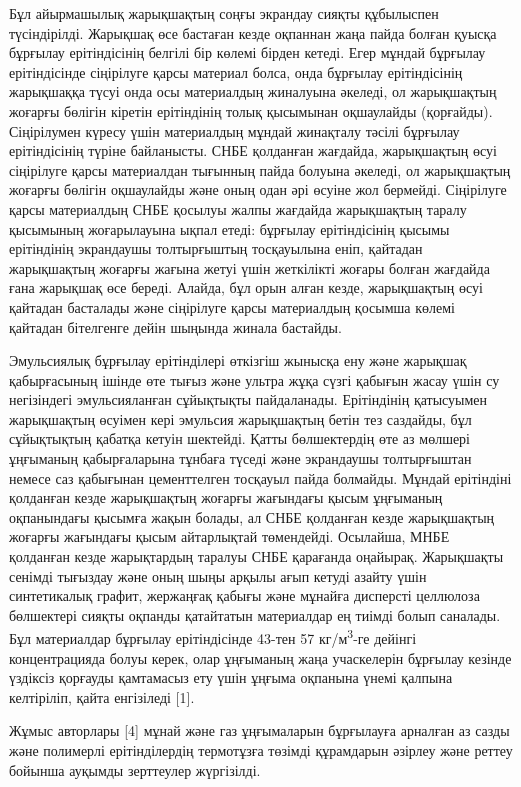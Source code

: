 \begin{multicols}{2}
Бұл айырмашылық жарықшақтың соңғы экрандау сияқты құбылыспен
түсіндірілді. Жарықшақ өсе бастаған кезде оқпаннан жаңа пайда болған
қуысқа бұрғылау ерітіндісінің белгілі бір көлемі бірден кетеді. Егер
мұндай бұрғылау ерітіндісінде сіңірілуге қарсы материал болса, онда
бұрғылау ерітіндісінің жарықшаққа түсуі онда осы материалдың жиналуына
әкеледі, ол жарықшақтың жоғарғы бөлігін кіретін ерітіндінің толық
қысымынан оқшаулайды (қорғайды). Сіңірілумен күресу үшін материалдың
мұндай жинақталу тәсілі бұрғылау ерітіндісінің түріне байланысты. СНБЕ
қолданған жағдайда, жарықшақтың өсуі сіңірілуге қарсы материалдан
тығынның пайда болуына әкеледі, ол жарықшақтың жоғарғы бөлігін
оқшаулайды және оның одан әрі өсуіне жол бермейді. Сіңірілуге қарсы
материалдың СНБЕ қосылуы жалпы жағдайда жарықшақтың таралу қысымының
жоғарылауына ықпал етеді: бұрғылау ерітіндісінің қысымы ерітіндінің
экрандаушы толтырғыштың тосқауылына еніп, қайтадан жарықшақтың жоғарғы
жағына жетуі үшін жеткілікті жоғары болған жағдайда ғана жарықшақ өсе
береді. Алайда, бұл орын алған кезде, жарықшақтың өсуі қайтадан
басталады және сіңірілуге қарсы материалдың қосымша көлемі қайтадан
бітелгенге дейін шыңында жинала бастайды.

Эмульсиялық бұрғылау ерітінділері өткізгіш жынысқа ену және жарықшақ
қабырғасының ішінде өте тығыз және ультра жұқа сүзгі қабығын жасау үшін
су негізіндегі эмульсияланған сұйықтықты пайдаланады. Ерітіндінің
қатысуымен жарықшақтың өсуімен кері эмульсия жарықшақтың бетін тез
саздайды, бұл сұйықтықтың қабатқа кетуін шектейді. Қатты бөлшектердің
өте аз мөлшері ұңғыманың қабырғаларына тұнбаға түседі және экрандаушы
толтырғыштан немесе саз қабығынан цементтелген тосқауыл пайда болмайды.
Мұндай ерітіндіні қолданған кезде жарықшақтың жоғарғы жағындағы қысым
ұңғыманың оқпанындағы қысымға жақын болады, ал СНБЕ қолданған кезде
жарықшақтың жоғарғы жағындағы қысым айтарлықтай төмендейді. Осылайша,
МНБЕ қолданған кезде жарықтардың таралуы СНБЕ қарағанда оңайырақ.
Жарықшақты сенімді тығыздау және оның шыңы арқылы ағып кетуді азайту
үшін синтетикалық графит, жержаңғақ қабығы және мұнайға дисперсті
целлюлоза бөлшектері сияқты оқпанды қатайтатын материалдар ең тиімді
болып саналады. Бұл материалдар бұрғылау ерітіндісінде 43-тен 57
кг/м\textsuperscript{3}-ге дейінгі концентрацияда болуы керек, олар
ұңғыманың жаңа учаскелерін бұрғылау кезінде үздіксіз қорғауды қамтамасыз
ету үшін ұңғыма оқпанына үнемі қалпына келтіріліп, қайта енгізіледі
{[}1{]}.

Жұмыс авторлары {[}4{]} мұнай және газ ұңғымаларын бұрғылауға арналған
аз сазды және полимерлі ерітінділердің термотұзға төзімді құрамдарын
әзірлеу және реттеу бойынша ауқымды зерттеулер жүргізілді.


\end{multicols}
